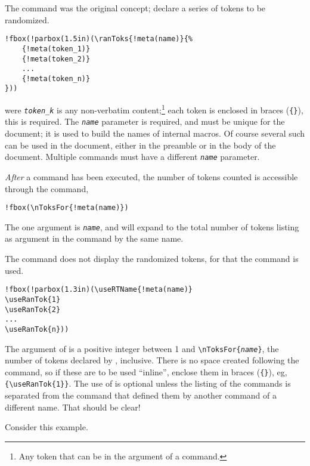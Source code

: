 \documentclass{article}
\def\meta#1{\textit{\texttt{#1}}}
\begin{document}
The  command was the original concept; declare a series of
tokens to be randomized.
\begin{Verbatim}[xleftmargin=20pt,commandchars=!()]
!fbox(!parbox(1.5in)(\ranToks{!meta(name)}{%
    {!meta(token_1)}
    {!meta(token_2)}
    ...
    {!meta(token_n)}
}))
\end{Verbatim}
were \meta{token\_k} is any non-verbatim content;\footnote{Any token that
can be in the argument of a command.} each token is enclosed in braces
(\verb!{}!), this is required. The \meta{name} parameter is required, and
must be unique for the document; it is used to build the names of internal
macros. Of course several such  can be used in the document,
either in the preamble or in the body of the document. Multiple
 commands must have a different \meta{name} parameter.

\emph{After} a  command has been executed, the number of tokens
counted is accessible through the  command,
\begin{Verbatim}[xleftmargin=20pt,commandchars=!()]
!fbox(\nToksFor{!meta(name)})
\end{Verbatim}
The one argument is \meta{name}, and will expand to the total number
of tokens listing as argument in the  command by the same
name.

The  command does not display the randomized tokens, for that
the command  is used.
\begin{Verbatim}[xleftmargin=20pt,commandchars=!()]
!fbox(!parbox(1.3in)(\useRTName{!meta(name)}
\useRanTok{1}
\useRanTok{2}
...
\useRanTok{n}))
\end{Verbatim}
The argument of  is a positive integer between 1 and
\verb!\nToksFor{!\meta{name}\verb!}!, the number of tokens declared by , inclusive.
There is no space created following the  command, so if
these are to be used ``inline'', enclose them in braces (\verb~{}~), eg,
\verb!{\useRanTok{1}}!. The use of  is optional unless the
listing of the  commands is separated from the 
command that defined them by another  command of a different
name. That should be clear!

Consider this example.
\end{document}
